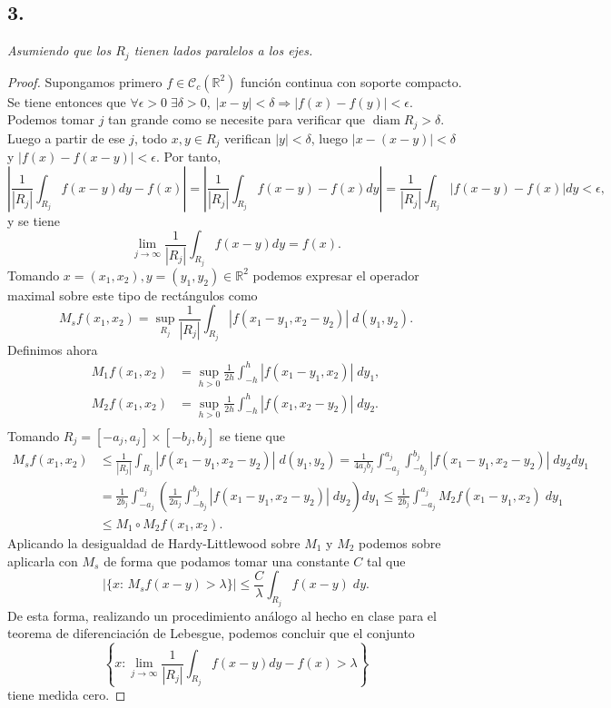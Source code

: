 \documentclass[11pt,a4paper]{article}
\begin{document}
\subsection*{3.} 
{\it Asumiendo que los $ R_j $ tienen lados paralelos a los ejes. }
\begin{proof}
  Supongamos primero $ f \in \mathcal C_c(\mathbb R^2) $ función continua con soporte compacto. Se tiene entonces que $ \forall \epsilon > 0 \; \exists \delta > 0, \; |x-y| < \delta \Rightarrow |f(x) - f(y)| < \epsilon $. Podemos tomar $ j $ tan grande como se necesite para verificar que $ \operatorname{diam} R_j > \delta $. Luego a partir de ese $ j $, todo $ x, y \in R_j $ verifican $ |y| < \delta $, luego  $ |x - (x - y)|  < \delta $ y $ |f(x) - f(x - y)|  < \epsilon $. Por tanto,
  $$
    \left| \frac{1}{|R_j|} \int_{R_j} f(x-y) dy - f(x) \right| = \left| \frac{1}{|R_j|} \int_{R_j} f(x-y) - f(x) dy \right| = \frac{1}{|R_j|} \int_{R_j} | f(x-y) - f(x) | dy < \epsilon, 
  $$
  y se tiene
  $$
  \lim_{j \to \infty} \frac{1}{|R_j|} \int_{R_j} f(x-y) dy = f(x).
  $$
  Tomando $ x = (x_1, x_2), y = (y_1, y_2) \in \mathbb R^2 $ podemos expresar el operador maximal sobre este tipo de rectángulos como
  $$
    M_s f(x_1, x_2) = \sup_{R_j} \frac{1}{|R_j|} \int_{R_j} |f(x_1-y_1, x_2-y_2)| \; d(y_1, y_2).
  $$
  Definimos ahora
  \begin{align*}
    M_1 f(x_1, x_2) &= \sup_{h>0} \frac{1}{2h} \int_{-h}^{h} |f(x_1 - y_1, x_2)|\;  dy_1,\\
    M_2 f(x_1, x_2) &= \sup_{h>0} \frac{1}{2h} \int_{-h}^{h} |f(x_1, x_2 - y_2)| \; dy_2. \\
  \end{align*}
  Tomando $ R_j = [-a_j, a_j] \times [-b_j, b_j] $ se tiene que
  \begin{align*} 
    M_s f(x_1, x_2) &\leq \frac{1}{|R_j|} \int_{R_j} |f(x_1-y_1, x_2-y_2)| \; d(y_1, y_2) = \frac{1}{4 a_j b_j} \int_{-a_j}^{a_j} \int_{-b_j}^{b_j} |f(x_1-y_1, x_2-y_2)| \; dy_2 dy_1 \\
    &= \frac{1}{2 b_j} \int_{-a_j}^{a_j} \left( \frac{1}{2 a_j} \int_{-b_j}^{b_j} |f(x_1-y_1, x_2-y_2)| \; dy_2 \right) dy_1 \leq \frac{1}{2 b_j} \int_{-a_j}^{a_j} M_2 f(x_1 - y_1, x_2) \; dy_1 \\ 
    &\leq M_1 \circ M_2 f(x_1, x_2).
  \end{align*}
  Aplicando la desigualdad de Hardy-Littlewood sobre $ M_1 $ y $ M_2 $ podemos sobre aplicarla con $ M_s $ de forma que podamos tomar una constante $ C $ tal que
  $$
    |\{x: \, M_s f(x - y) > \lambda\}| \leq \frac{C}{\lambda} \int_{R_j} f(x - y) \; dy.
  $$
  De esta forma, realizando un procedimiento análogo al hecho en clase para el teorema de diferenciación de Lebesgue, podemos concluir que el conjunto
  $$
    \left\{ x: \lim_{j \to \infty} \frac{1}{|R_j|} \int_{R_j} f(x-y) dy - f(x) > \lambda \right\}
  $$
  tiene medida cero.
\end{proof}
\end{document}
